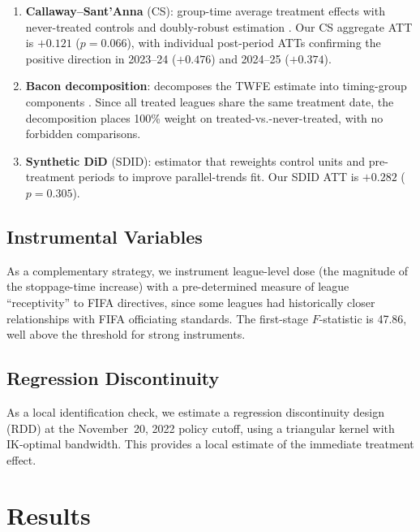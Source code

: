 \documentclass[12pt]{article}
\begin{document}
\begin{enumerate}
  \item \textbf{Callaway--Sant'Anna} (CS): group-time average treatment
    effects with never-treated controls and doubly-robust estimation
    \citep{callaway2021difference}. Our CS aggregate ATT is $+0.121$
    ($p = 0.066$), with individual post-period ATTs confirming the
    positive direction in 2023--24 ($+0.476$) and 2024--25 ($+0.374$).
  \item \textbf{Bacon decomposition}: decomposes the TWFE estimate into
    timing-group components \citep{goodmanbacon2021difference}. Since
    all treated leagues share the same treatment date, the decomposition
    places 100\% weight on treated-vs.-never-treated, with no forbidden
    comparisons.
  \item \textbf{Synthetic DiD} (SDID): \citet{arkhangelsky2021synthetic}
    estimator that reweights control units and pre-treatment periods to
    improve parallel-trends fit. Our SDID ATT is $+0.282$ ($p = 0.305$).
\end{enumerate}

\subsection{Instrumental Variables}

As a complementary strategy, we instrument league-level dose
(the magnitude of the stoppage-time increase) with a pre-determined
measure of league ``receptivity'' to FIFA directives, since some leagues
had historically closer relationships with FIFA officiating standards. The first-stage $F$-statistic is 47.86, well
above the \citet{stockyogo2005testing} threshold for strong instruments.

\subsection{Regression Discontinuity}

As a local identification check, we estimate a regression discontinuity
design (RDD) at the November~20, 2022 policy cutoff, using a triangular
kernel with IK-optimal bandwidth. This provides a local estimate of the
immediate treatment effect.

\section{Results}\label{sec:results}
\end{document}
